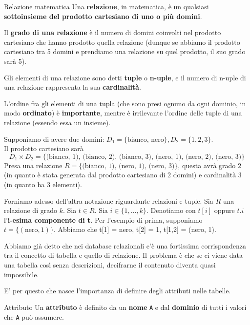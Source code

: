 \documentclass[12pt]{report}
\begin{document}
	\begin{definizione}{Relazione matematica}{}
		Una \textbf{relazione}, in matematica, è un qualsiasi \textbf{sottoinsieme del prodotto cartesiano di uno o più domini}.
		\smallbreak
		
		Il \textbf{grado di una relazione} è il numero di domini coinvolti nel prodotto cartesiano che hanno prodotto quella relazione (dunque se abbiamo il prodotto cartesiano tra 5 domini e prendiamo una relazione su quel prodotto, il suo grado sarà 5).
		\smallbreak
		
		Gli elementi di una relazione sono detti \textbf{tuple} o \textbf{n-uple}, e il numero di n-uple di una relazione rappresenta la sua \textbf{cardinalità}.
		
		L'ordine fra gli elementi di una tupla (che sono presi ognuno da ogni dominio, in modo \textbf{ordinato}) è \textbf{importante}, mentre è irrilevante l'ordine delle tuple di una relazione (essendo essa un insieme).	
	\end{definizione}
	Supponiamo di avere due domini: $D_1 = \{\text{bianco, nero}\}, D_2 = \{1, 2, 3\}$.\\
	Il prodotto cartesiano sarà
	\[
		D_1 \times D_2 = \{\text{(bianco, 1), (bianco, 2), (bianco, 3), (nero, 1), (nero, 2), (nero, 3)}\}
	\]
	Presa una relazione $R = \{\text{(bianco, 1), (nero, 1), (nero, 3)}\}$, questa avrà grado 2 (in quanto è stata generata dal prodotto cartesiano di 2 domini) e cardinalità 3 (in quanto ha 3 elementi).
	
	Forniamo adesso dell'altra notazione riguardante relazioni e tuple.
	Sia $R$ una relazione di grado $k$. Sia $t \in R$. Sia $i \in \{1, \dots, k\}$. Denotiamo con $t[i]$ oppure $t.i$ l'\textbf{i-esima componente di t}.
	Per l'esempio di prima, supponiamo $t = \{(\text{nero}, 1)\}$. Abbiamo che t[1] = nero, t[2] = 1, t[1,2] = (nero, 1).
	
	Abbiamo già detto che nei database relazionali c'è una fortissima corrispondenza tra il concetto di tabella e quello di relazione. Il problema è che se ci viene data una tabella così senza descrizioni, decifrarne il contenuto diventa quasi impossibile.
	
	E' per questo che nasce l'importanza di definire degli attributi nelle tabelle.
	\begin{definizione}{Attributo}{}
		Un \textbf{attributo} è definito da un \textbf{nome} \texttt{A} e dal \textbf{dominio} di tutti i valori che \texttt{A} può assumere.
	\end{definizione}
	
\end{document}
